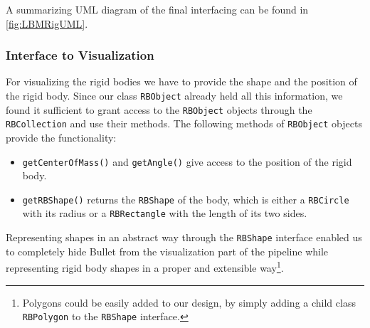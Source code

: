 A summarizing UML diagram of the final interfacing can be found in \autoref{fig:LBMRigUML}.


%

\subsubsection{Interface to Visualization}

For visualizing the rigid bodies we have to provide the shape and the position of the rigid body. Since our class \texttt{RBObject} already held all this information, we found it sufficient to grant access to the \texttt{RBObject} objects through the \texttt{RBCollection} and use their methods. The following methods of \texttt{RBObject} objects provide the functionality:
\begin{itemize}
\item \texttt{getCenterOfMass()} and \texttt{getAngle()} give access to the position of the rigid body.
\item \texttt{getRBShape()} returns the \texttt{RBShape} of the body, which is either a \texttt{RBCircle} with its radius or a \texttt{RBRectangle} with the length of its two sides.
\end{itemize}
Representing shapes in an abstract way through the \texttt{RBShape} interface enabled us to completely hide Bullet from the visualization part of the pipeline while representing rigid body shapes in a proper and extensible way\footnote{Polygons could be easily added to our design, by simply adding a child class \texttt{RBPolygon} to the \texttt{RBShape} interface.}. 
